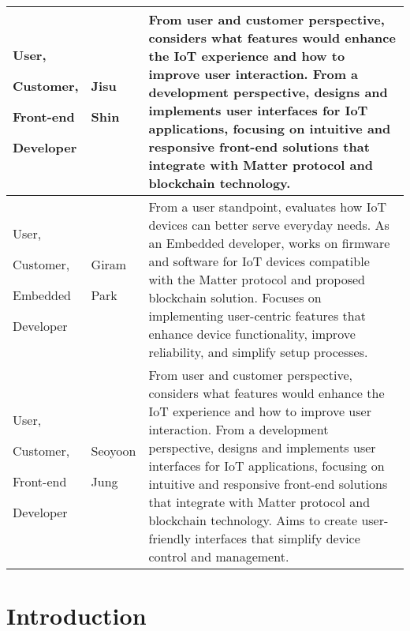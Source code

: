 \documentclass[conference]{IEEEtran}
\begin{document}
	\begin{table}
		\def\arraystretch{1.24} \small
		\begin{tabular}{|p{1.8cm}|p{1.4cm}|p{4.4cm}|}
			\hline
			User, \par Customer, \par Front-end \par Developer & Jisu \par Shin    & From user and customer perspective, considers what features would enhance the IoT experience and how to improve user interaction. From a development perspective, designs and implements user interfaces for IoT applications, focusing on intuitive and responsive front-end solutions that integrate with Matter protocol and blockchain technology.                                                                                      \\
			\hline
			User, \par Customer, \par Embedded \par Developer  & Giram \par Park   & From a user standpoint, evaluates how IoT devices can better serve everyday needs. As an Embedded developer, works on firmware and software for IoT devices compatible with the Matter protocol and proposed blockchain solution. Focuses on implementing user-centric features that enhance device functionality, improve reliability, and simplify setup processes.                                                                       \\
			\hline
			User, \par Customer, \par Front-end \par Developer & Seoyoon \par Jung & From user and customer perspective, considers what features would enhance the IoT experience and how to improve user interaction. From a development perspective, designs and implements user interfaces for IoT applications, focusing on intuitive and responsive front-end solutions that integrate with Matter protocol and blockchain technology. Aims to create user-friendly interfaces that simplify device control and management. \\
			\hline
		\end{tabular}
	\end{table}

	\section{Introduction}
\end{document}
